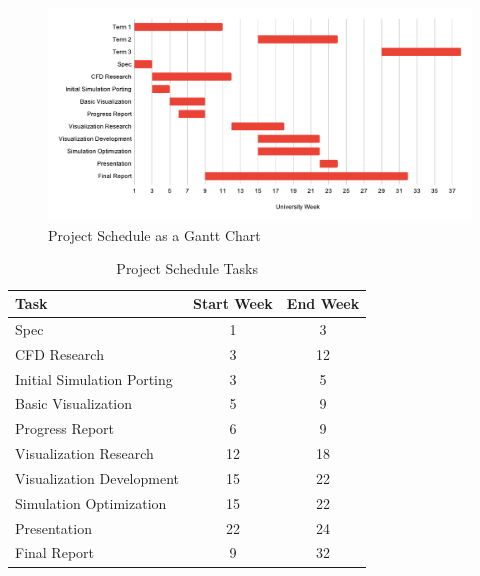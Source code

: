 \begin{figure}[ht]
    \centering
    \includegraphics[width=\linewidth, trim={0 0 0 2.7cm},clip]{Ch50ProjectManagement/cs311_gantt_chart.svg.pdf}
    \caption{Project Schedule as a Gantt Chart}
    \label{fig:project schedule gantt}
\end{figure}

\begin{table}[ht]
    \centering
    \begin{tabular}{l|c|c}
    \textbf{Task} & \textbf{Start Week} & \textbf{End Week} \\
    \hline
    Spec & 1 & 3 \\
    CFD Research & 3 & 12 \\
    Initial Simulation Porting & 3 & 5 \\
    Basic Visualization & 5 & 9 \\
    Progress Report & 6 & 9 \\
    Visualization Research & 12 & 18 \\
    Visualization Development & 15 & 22 \\
    Simulation Optimization & 15 & 22 \\
    Presentation & 22 & 24 \\
    Final Report & 9 & 32 \\
    \end{tabular}
    \caption{Project Schedule Tasks}
    \label{tab:project schedule table}
\end{table}

